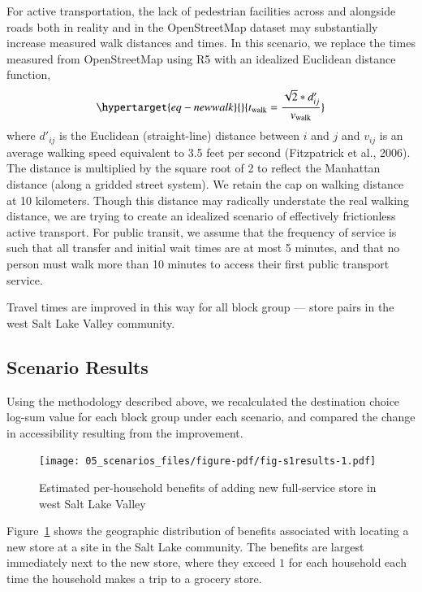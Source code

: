 \documentclass[
  letterpaper,
  authoryear,
  review,
  3p]{elsarticle}
\begin{document}
For active transportation, the lack of pedestrian facilities across and
alongside roads both in reality and in the OpenStreetMap dataset may
substantially increase measured walk distances and times. In this
scenario, we replace the times measured from OpenStreetMap using R5 with
an idealized Euclidean distance function,
\begin{equation}\protect\hypertarget{eq-newwalk}{}{
t_{\mathrm{walk}} = \frac{\sqrt{2} * d'_{ij}}{v_{\mathrm{walk}}}
}\label{eq-newwalk}\end{equation} where \(d'_{ij}\) is the Euclidean
(straight-line) distance between \(i\) and \(j\) and \(v_{ij}\) is an
average walking speed equivalent to 3.5 feet per second (Fitzpatrick et
al., 2006). The distance is multiplied by the square root of 2 to
reflect the Manhattan distance (along a gridded street system). We
retain the cap on walking distance at 10 kilometers. Though this
distance may radically understate the real walking distance, we are
trying to create an idealized scenario of effectively frictionless
active transport. For public transit, we assume that the frequency of
service is such that all transfer and initial wait times are at most 5
minutes, and that no person must walk more than 10 minutes to access
their first public transport service.

Travel times are improved in this way for all block group --- store
pairs in the west Salt Lake Valley community.

\hypertarget{scenario-results}{%
\subsection{Scenario Results}\label{scenario-results}}

Using the methodology described above, we recalculated the destination
choice log-sum value for each block group under each scenario, and
compared the change in accessibility resulting from the improvement.

\begin{figure}

{\centering \texttt{[image: 05\_scenarios\_files/figure-pdf/fig-s1results-1.pdf]}

}

\caption{\label{fig-s1results}Estimated per-household benefits of adding
new full-service store in west Salt Lake Valley}

\end{figure}

Figure~\ref{fig-s1results} shows the geographic distribution of benefits
associated with locating a new store at a site in the Salt Lake
community. The benefits are largest immediately next to the new store,
where they exceed \(1\) for each household each time the household makes
a trip to a grocery store.
\end{document}
